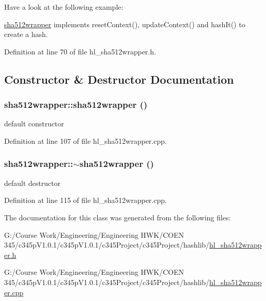 Have a look at the following example:


\begin{DoxyCodeInclude}
\end{DoxyCodeInclude}


\hyperlink{classsha512wrapper}{sha512wrapper} implements resetContext(), updateContext() and hashIt() to create a hash. 

Definition at line 70 of file hl\_\-sha512wrapper.h.

\subsection{Constructor \& Destructor Documentation}
\hypertarget{classsha512wrapper_aec38bb5768508acb8a40d9d309fa1e00}{
\subsubsection[{sha512wrapper}]{\setlength{\rightskip}{0pt plus 5cm}sha512wrapper::sha512wrapper ()}}
\label{classsha512wrapper_aec38bb5768508acb8a40d9d309fa1e00}


default constructor 

Definition at line 107 of file hl\_\-sha512wrapper.cpp.\hypertarget{classsha512wrapper_a4506794c3f6ec8bcf4d2108e1a91cc2a}{
\subsubsection[{$\sim$sha512wrapper}]{\setlength{\rightskip}{0pt plus 5cm}sha512wrapper::$\sim$sha512wrapper ()}}
\label{classsha512wrapper_a4506794c3f6ec8bcf4d2108e1a91cc2a}


default destructor 

Definition at line 115 of file hl\_\-sha512wrapper.cpp.

The documentation for this class was generated from the following files:\begin{DoxyCompactItemize}
\item 
G:/Course Work/Engineering/Engineering HWK/COEN 345/c345pV1.0.1/c345pV1.0.1/c345Project/c345Project/hashlib/\hyperlink{hl__sha512wrapper_8h}{hl\_\-sha512wrapper.h}\item 
G:/Course Work/Engineering/Engineering HWK/COEN 345/c345pV1.0.1/c345pV1.0.1/c345Project/c345Project/hashlib/\hyperlink{hl__sha512wrapper_8cpp}{hl\_\-sha512wrapper.cpp}\end{DoxyCompactItemize}
